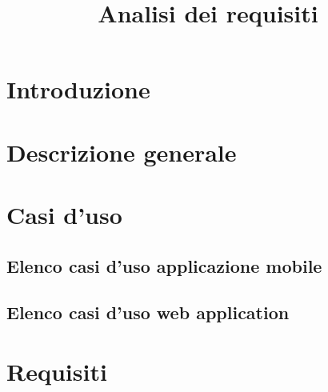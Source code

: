 \documentclass{article}
\title{Analisi dei requisiti}
\begin{document}


\section{Introduzione}%
\label{sec:introduzione}


\newpage
\section{Descrizione generale}%
\label{sec:descrizione_generale}



\newpage
\section{Casi d'uso}%
\label{sec:casi_duso}



\subsection{Elenco casi d'uso applicazione mobile}%
\label{sub:casi_duso_app}



\subsection{Elenco casi d'uso web application}%
\label{sub:casi_duso_web_app}



\newpage
\section{Requisiti}%
\label{sec:requisiti}


\end{document}
